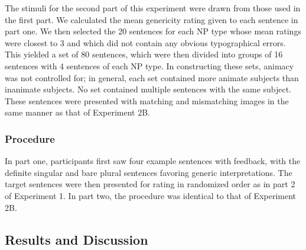 \documentclass[10pt,letterpaper]{article}
\begin{document}
The stimuli for the second part of this experiment were drawn from those used in the first part. We calculated the mean genericity rating given to each sentence in part one. We then selected the 20 sentences for each NP type whose mean ratings were closest to 3 and which did not contain any obvious typographical errors. This yielded a set of 80 sentences, which were then divided into groups of 16 sentences with 4 sentences of each NP type. In constructing these sets, animacy was not controlled for; in general, each set contained more animate subjects than inanimate subjects. No set contained multiple sentences with the same subject. These sentences were presented with matching and mismatching images in the same manner as that of Experiment 2B. 

\subsubsection{Procedure} 

In part one, participants first saw four example sentences with feedback, with the definite singular and bare plural sentences favoring generic interpretations. The target sentences were then presented for rating in randomized order as in part 2 of Experiment 1. In part two, the procedure was identical to that of Experiment 2B. 



\subsection{Results and Discussion}
\end{document}
